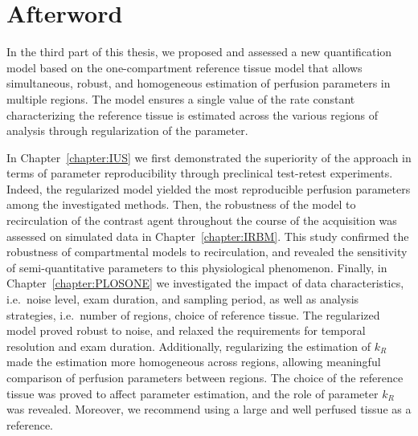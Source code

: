 \chapter*{Afterword}
In the third part of this thesis, we proposed and assessed a new quantification model based on the one-compartment reference tissue model that allows simultaneous, robust, and homogeneous estimation of perfusion parameters in multiple regions.
The model ensures a single value of the rate constant characterizing the reference tissue is estimated across the various regions of analysis through regularization of the parameter.

In Chapter~\ref{chapter:IUS} we first demonstrated the superiority of the approach in terms of parameter reproducibility through preclinical test-retest experiments.
Indeed, the regularized model yielded the most reproducible perfusion parameters among the investigated methods.
Then, the robustness of the model to recirculation of the contrast agent throughout the course of the acquisition was assessed on simulated data in Chapter~\ref{chapter:IRBM}.
This study confirmed the robustness of compartmental models to recirculation, and revealed the sensitivity of semi-quantitative parameters to this physiological phenomenon.
Finally, in Chapter~\ref{chapter:PLOSONE} we investigated the impact of data characteristics, i.e.~noise level, exam duration, and sampling period, as well as analysis strategies, i.e.~number of regions, choice of reference tissue.
The regularized model proved robust to noise, and relaxed the requirements for temporal resolution and exam duration.
Additionally, regularizing the estimation of $k_R$ made the estimation more homogeneous across regions, allowing meaningful comparison of perfusion parameters between regions.
The choice of the reference tissue was proved to affect parameter estimation, and the role of parameter $k_R$ was revealed.
Moreover, we recommend using a large and well perfused tissue as a reference.

